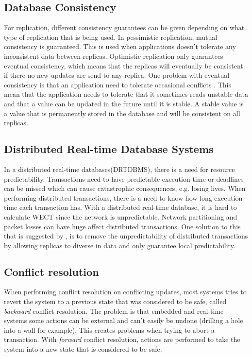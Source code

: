 \subsection{Database Consistency} %
\label{sub:consistency}

For replication, different consistency guarantees can be given depending on what type of replication that is being used. In pessimistic replication, mutual consistency is guaranteed. This is used when applications doesn't tolerate any inconsistent data between replicas. Optimistic replication only guarantees eventual consistency, which means that the replicas will eventually be consistent if there no new updates are send to any replica. One problem with eventual consistency is that an application need to tolerate occasional conflicts \cite[]{saito2005}. This mean that the application needs to tolerate that it sometimes reads unstable data and that a value can be updated in the future until it is stable. A stable value is a value that is permanently stored in the database and will be consistent on all replicas.


\subsection{Distributed Real-time Database Systems} %
\label{sub:subsection_name}

In a distributed real-time databases(DRTDBMS), there is a need for resource predictability. Transactions need to have predictable execution time or deadlines can be missed which can cause catastrophic consequences, e.g. losing lives. When performing distributed transactions, there is a need to know how long execution time each transaction has. With a distributed real-time database, it is hard to calculate WECT since the network is unpredictable. Network partitioning and packet losses can have huge affect distributed transactions. One solution to this that is suggested by \cite{deeds}, is to remove the unpredictability of distributed transactions by allowing replicas to diverse in data and only guarantee local predictability.  

\subsection{Conflict resolution} %
\label{sub:conflict_resolution}

When performing conflict resolution on conflicting updates, most systems tries to revert the system to a previous state that was considered to be safe, called \emph{backward} conflict resolution. The problem is that embedded and real-time systems some actions can be external and can't easily be undone (drilling a hole into a wall for example). This creates problems when trying to abort a transaction. 
With \emph{forward} conflict resolution, actions are performed to take the system into a new state that is considered to be safe.      

